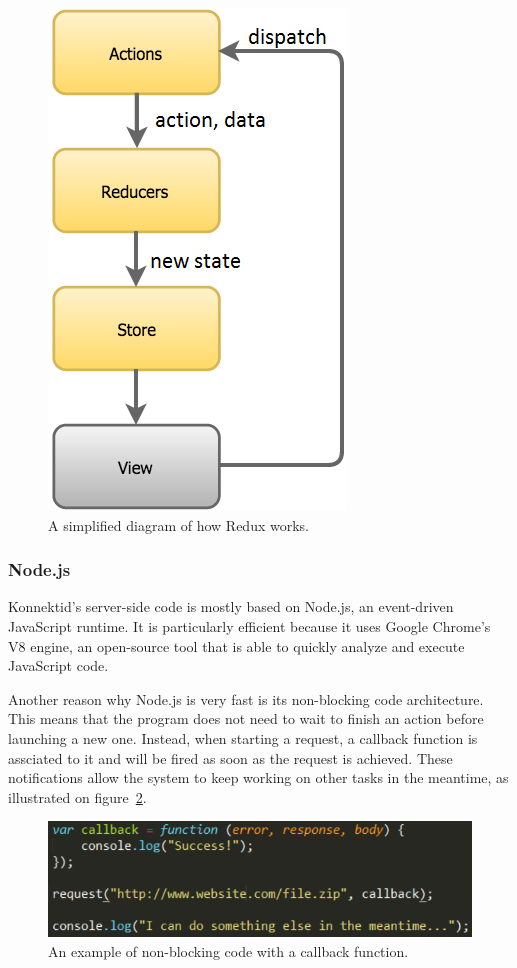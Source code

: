 \begin{figure}[H]
    \centering
    \includegraphics[scale=0.7]{figure/reduxFlow.png}
    \caption{A simplified diagram of how Redux works.}
    \label{fig:reduxSumup}
\end{figure}

\subsubsection{Node.js}
\label{sssec:node}

Konnektid's server-side code is mostly based on Node.js, an event-driven JavaScript runtime. It is particularly efficient because it uses Google Chrome's V8 engine,
an open-source tool that is able to quickly analyze and execute JavaScript code.

Another reason why Node.js is very fast is its non-blocking code architecture. This means that the program does not need to wait to finish an action before launching
a new one. Instead, when starting a request, a callback function is assciated to it and will be fired as soon as the request is achieved. These notifications allow
the system to keep working on other tasks in the meantime, as illustrated on {\sc figure}~\ref{fig:callback}.

\begin{figure}[H]
    \centering
    \includegraphics[scale=0.8]{figure/callback.png}
    \caption{An example of non-blocking code with a callback function.}
    \label{fig:callback}
\end{figure}

